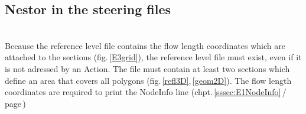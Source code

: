 \subsection{Nestor in the steering files} \label{ssec:E1SteerF}
%
\textcolor{white}{force a empty line by white lettering}\\ %
Because the reference level file contains the flow length coordinates which are attached to the sections (fig.\,\ref{E3grid}),
the reference level file must exist, even if it is not adressed by an Action.
The file must contain at least two sections which define an area that covers all polygons (fig.\,\ref{refl3D},\,\ref{geom2D}).
The flow length coordinates are required to print the NodeInfo line (chpt.\,\ref{sssec:E1NodeInfo}\,/\,page\,\pageref{txt:E1XdigX})
